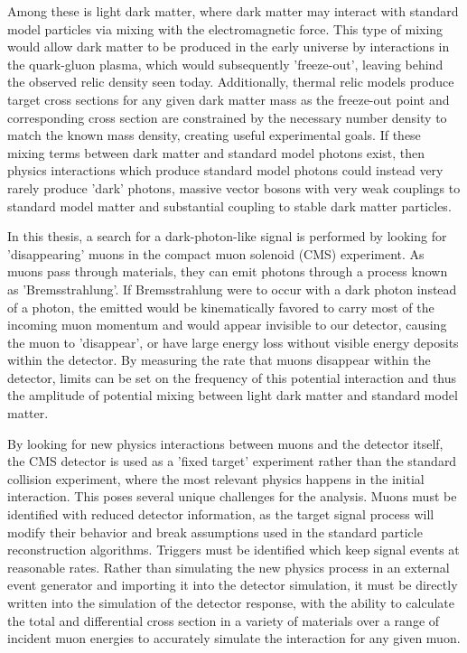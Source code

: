 Among these is light dark matter, where dark matter may interact with standard model particles via mixing with the electromagnetic force. 
This type of mixing would allow dark matter to be produced in the early universe by interactions in the quark-gluon plasma, which would subsequently 'freeze-out', leaving behind the observed relic density seen today. 
Additionally, thermal relic models produce target cross sections for any given dark matter mass as the freeze-out point and corresponding cross section are constrained by the necessary number density to match the known mass density, creating useful experimental goals.
If these mixing terms between dark matter and standard model photons exist, then physics interactions which produce standard model photons could instead very rarely produce 'dark' photons, massive vector bosons with very weak couplings to standard model matter and substantial coupling to stable dark matter particles.

In this thesis, a search for a dark-photon-like signal is performed by looking for 'disappearing' muons in the compact muon solenoid (CMS) experiment. 
As muons pass through materials, they can emit photons through a process known as 'Bremsstrahlung'. 
If Bremsstrahlung were to occur with a dark photon instead of a photon, the emitted \aprime would be kinematically favored to carry most of the incoming muon momentum and would appear invisible to our detector, causing the muon to 'disappear', or have large energy loss without visible energy deposits within the detector.
By measuring the rate that muons disappear within the detector, limits can be set on the frequency of this potential interaction and thus the amplitude of potential mixing between light dark matter and standard model matter.

By looking for new physics interactions between muons and the detector itself, the CMS detector is used as a 'fixed target' experiment rather than the standard collision experiment, where the most relevant physics happens in the initial interaction.
This poses several unique challenges for the analysis.
Muons must be identified with reduced detector information, as the target signal process will modify their behavior and break assumptions used in the standard particle reconstruction algorithms.
Triggers must be identified which keep signal events at reasonable rates.
Rather than simulating the new physics process in an external event generator and importing it into the detector simulation, it must be directly written into the simulation of the detector response, with the ability to calculate the total and differential cross section in a variety of materials over a range of incident muon energies to accurately simulate the interaction for any given muon.


